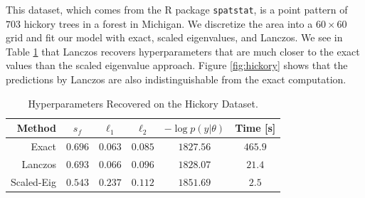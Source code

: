 This dataset, which comes from the R package {\tt spatstat}, is a point pattern
of $703$ hickory trees in a forest in Michigan. We discretize the area into a
$60 \times 60$ grid and fit our model with exact, scaled eigenvalues, and
Lanczos. We see in Table \ref{tab:hickory} that Lanczos recovers hyperparameters
that are much closer to the exact values than the scaled eigenvalue approach.
Figure \ref{fig:hickory} shows that the predictions by Lanczos are also
indistinguishable from the exact computation.

\begin{table}[ht]
  \centering
  \caption{Hyperparameters Recovered on the Hickory Dataset.}\label{tab:hickory}
  \begin{tabular}{r c c c c c}
    \toprule
    Method & $s_f$ & $\ell_1$ & $\ell_2$ & $-\log p(y|\theta)$ & Time [s]\\
    \midrule
    Exact & $0.696$  & $0.063$  & $0.085$ &  $1827.56$ & $465.9$\\
    Lanczos & $0.693$   & $0.066$   & $0.096$ &  $1828.07$ & $21.4$\\
    Scaled\hyp{}Eig & $0.543$  & $0.237$  & $0.112$ &  $1851.69$ & $2.5$\\
    \bottomrule
  \end{tabular}
\end{table}
\vfill


